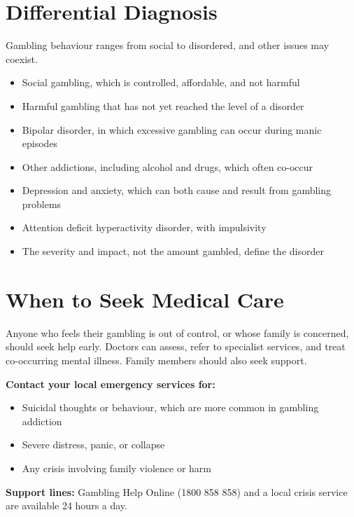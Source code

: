 \section*{Differential Diagnosis}
Gambling behaviour ranges from social to disordered, and other issues may coexist.
\begin{itemize}
    \item Social gambling, which is controlled, affordable, and not harmful
    \item Harmful gambling that has not yet reached the level of a disorder
    \item Bipolar disorder, in which excessive gambling can occur during manic episodes
    \item Other addictions, including alcohol and drugs, which often co-occur
    \item Depression and anxiety, which can both cause and result from gambling problems
    \item Attention deficit hyperactivity disorder, with impulsivity
    \item The severity and impact, not the amount gambled, define the disorder
\end{itemize}

\section*{When to Seek Medical Care}
Anyone who feels their gambling is out of control, or whose family is concerned, should seek help early. Doctors can assess, refer to specialist services, and treat co-occurring mental illness. Family members should also seek support.

\textbf{Contact your local emergency services for:}
\begin{itemize}
    \item Suicidal thoughts or behaviour, which are more common in gambling addiction
    \item Severe distress, panic, or collapse
    \item Any crisis involving family violence or harm
\end{itemize}

\textbf{Support lines:} Gambling Help Online (1800 858 858) and a local crisis service are available 24 hours a day.

